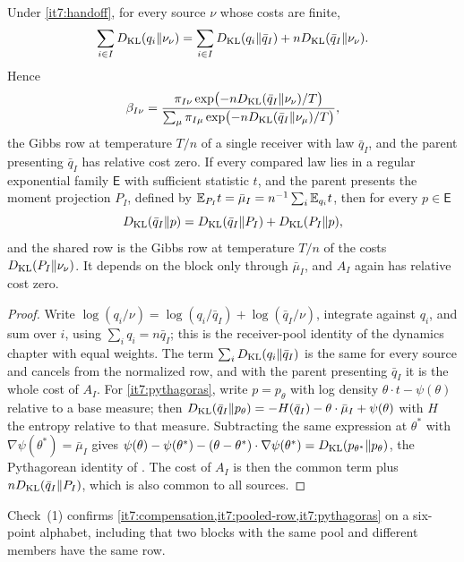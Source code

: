 \documentclass[11pt,letterpaper]{report}
\begin{document}
Under \cref{it7:handoff}, for every source $\nu$ whose costs are finite,
\begin{equation}
\sum_{i\in I}D_{\mathrm{KL}}(q_i\Vert\nu_\nu)=\sum_{i\in I}D_{\mathrm{KL}}(q_i\Vert\bar q_I)+nD_{\mathrm{KL}}(\bar q_I\Vert\nu_\nu).
\label{it7:compensation}
\end{equation}
Hence
\begin{equation}
\beta_{I\nu}=\frac{\pi_{I\nu}\exp\bigl(-nD_{\mathrm{KL}}(\bar q_I\Vert\nu_\nu)/T\bigr)}{\sum_\mu\pi_{I\mu}\exp\bigl(-nD_{\mathrm{KL}}(\bar q_I\Vert\nu_\mu)/T\bigr)},
\label{it7:pooled-row}
\end{equation}
the Gibbs row at temperature $T/n$ of a single receiver with law $\bar q_I$, and the parent presenting $\bar q_I$ has relative cost zero. If every compared law lies in a regular exponential family $\mathsf E$ with sufficient statistic $t$, and the parent presents the moment projection $P_I$, defined by $\mathbb E_{P_I}t=\bar\mu_I=n^{-1}\sum_i\mathbb E_{q_i}t$, then for every $p\in\mathsf E$
\begin{equation}
D_{\mathrm{KL}}(\bar q_I\Vert p)=D_{\mathrm{KL}}(\bar q_I\Vert P_I)+D_{\mathrm{KL}}(P_I\Vert p),
\label{it7:pythagoras}
\end{equation}
and the shared row is the Gibbs row at temperature $T/n$ of the costs $D_{\mathrm{KL}}(P_I\Vert\nu_\nu)$. It depends on the block only through $\bar\mu_I$, and $A_I$ again has relative cost zero.
\begin{proof}
Write $\log(q_i/\nu)=\log(q_i/\bar q_I)+\log(\bar q_I/\nu)$, integrate against $q_i$, and sum over $i$, using $\sum_iq_i=n\bar q_I$; this is the receiver-pool identity of the dynamics chapter with equal weights. The term $\sum_iD_{\mathrm{KL}}(q_i\Vert\bar q_I)$ is the same for every source and cancels from the normalized row, and with the parent presenting $\bar q_I$ it is the whole cost of $A_I$. For \cref{it7:pythagoras}, write $p=p_\theta$ with log density $\theta\cdot t-\psi(\theta)$ relative to a base measure; then $D_{\mathrm{KL}}(\bar q_I\Vert p_\theta)=-H(\bar q_I)-\theta\cdot\bar\mu_I+\psi(\theta)$ with $H$ the entropy relative to that measure. Subtracting the same expression at $\theta^*$ with $\nabla\psi(\theta^*)=\bar\mu_I$ gives $\psi(\theta)-\psi(\theta^*)-(\theta-\theta^*)\cdot\nabla\psi(\theta^*)=D_{\mathrm{KL}}(p_{\theta^*}\Vert p_\theta)$, the Pythagorean identity of \citet{Csiszar1975}. The cost of $A_I$ is then the common term plus $nD_{\mathrm{KL}}(\bar q_I\Vert P_I)$, which is also common to all sources.
\end{proof}

Check~(1) confirms \cref{it7:compensation,it7:pooled-row,it7:pythagoras} on a six-point alphabet, including that two blocks with the same pool and different members have the same row.
\end{document}

